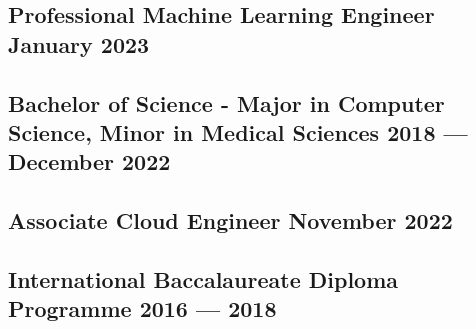 \documentclass[letter,10pt]{article}
\begin{document}
\subsection{{Professional Machine Learning Engineer \hfill January 2023}}

\vspace{1.25em}

\subsection{{Bachelor of Science - Major in Computer Science, Minor in Medical Sciences \hfill 2018 --- December 2022}}

\vspace{1.25em}

\subsection{{Associate Cloud Engineer \hfill November 2022}}

\vspace{1.25em}

\subsection{{International Baccalaureate Diploma Programme \hfill 2016 --- 2018}}

\vspace{1.25em}
\end{document}
